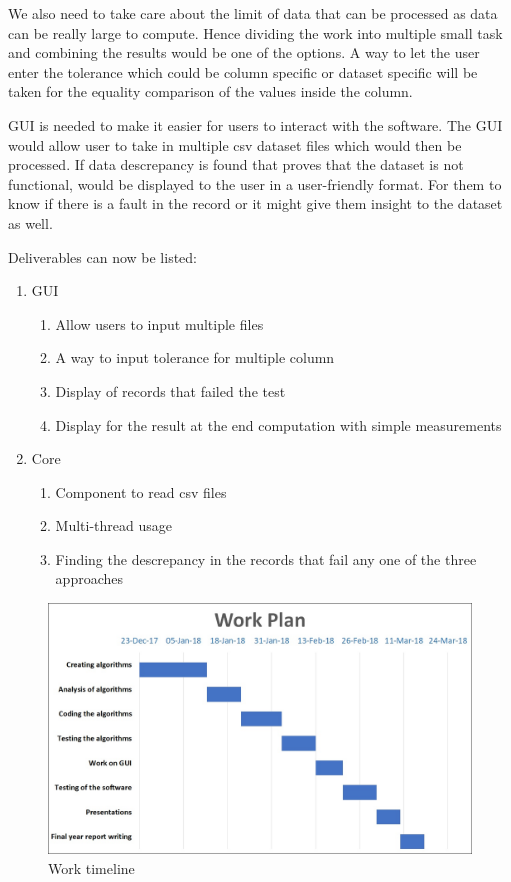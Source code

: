We also need to take care about the limit of data that can be processed as data can be really large to compute. Hence dividing the work into multiple small task and combining the results would be one of the options. A way to let the user enter the tolerance which could be column specific or dataset specific will be taken for the equality comparison of the values inside the column.

GUI is needed to make it easier for users to interact with the software. The GUI would allow user to take in multiple csv dataset files which would then be processed. If data descrepancy is found that proves that the dataset is not functional, would be displayed to the user in a user-friendly format. For them to know if there is a fault in the record or it might give them insight to the dataset as well.

Deliverables can now be listed:
\begin{enumerate}
    \item GUI
    \begin{enumerate}
        \item Allow users to input multiple files
        \item A way to input tolerance for multiple column
        \item Display of records that failed the test
        \item Display for the result at the end computation with simple measurements
    \end{enumerate}
    \item Core
    \begin{enumerate}
        \item Component to read csv files
        \item Multi-thread usage
        \item Finding the descrepancy in the records that fail any one of the three approaches
    \end{enumerate}
\end{enumerate}

\begin{figure}[ht]
    \centering
    \includegraphics[width=400pt]{gantchart}
    \caption{\label{fig:gantchart} Work timeline}    
\end{figure}

